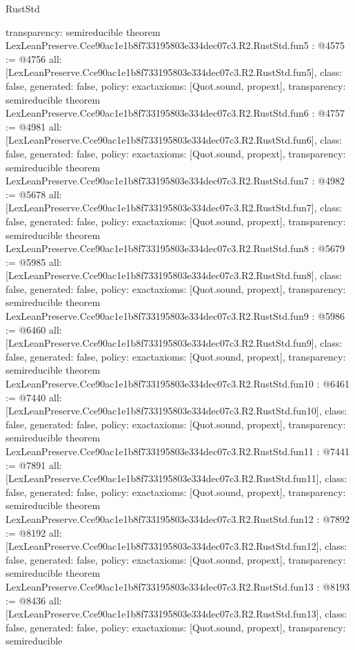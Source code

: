 \begin{lexlean}{RustStd}
\begin{coremodule}
{  transparency: semireducible
}
theorem LexLeanPreserve.Cce90ac1e1b8f733195803e334dec07c3.R2.RustStd.fun5 : @4575 := @4756 {
  all: [LexLeanPreserve.Cce90ac1e1b8f733195803e334dec07c3.R2.RustStd.fun5],
  class: false,
  generated: false,
  policy: exact{axioms: [Quot.sound, propext]},
  transparency: semireducible
}
theorem LexLeanPreserve.Cce90ac1e1b8f733195803e334dec07c3.R2.RustStd.fun6 : @4757 := @4981 {
  all: [LexLeanPreserve.Cce90ac1e1b8f733195803e334dec07c3.R2.RustStd.fun6],
  class: false,
  generated: false,
  policy: exact{axioms: [Quot.sound, propext]},
  transparency: semireducible
}
theorem LexLeanPreserve.Cce90ac1e1b8f733195803e334dec07c3.R2.RustStd.fun7 : @4982 := @5678 {
  all: [LexLeanPreserve.Cce90ac1e1b8f733195803e334dec07c3.R2.RustStd.fun7],
  class: false,
  generated: false,
  policy: exact{axioms: [Quot.sound, propext]},
  transparency: semireducible
}
theorem LexLeanPreserve.Cce90ac1e1b8f733195803e334dec07c3.R2.RustStd.fun8 : @5679 := @5985 {
  all: [LexLeanPreserve.Cce90ac1e1b8f733195803e334dec07c3.R2.RustStd.fun8],
  class: false,
  generated: false,
  policy: exact{axioms: [Quot.sound, propext]},
  transparency: semireducible
}
theorem LexLeanPreserve.Cce90ac1e1b8f733195803e334dec07c3.R2.RustStd.fun9 : @5986 := @6460 {
  all: [LexLeanPreserve.Cce90ac1e1b8f733195803e334dec07c3.R2.RustStd.fun9],
  class: false,
  generated: false,
  policy: exact{axioms: [Quot.sound, propext]},
  transparency: semireducible
}
theorem LexLeanPreserve.Cce90ac1e1b8f733195803e334dec07c3.R2.RustStd.fun10 : @6461 := @7440 {
  all: [LexLeanPreserve.Cce90ac1e1b8f733195803e334dec07c3.R2.RustStd.fun10],
  class: false,
  generated: false,
  policy: exact{axioms: [Quot.sound, propext]},
  transparency: semireducible
}
theorem LexLeanPreserve.Cce90ac1e1b8f733195803e334dec07c3.R2.RustStd.fun11 : @7441 := @7891 {
  all: [LexLeanPreserve.Cce90ac1e1b8f733195803e334dec07c3.R2.RustStd.fun11],
  class: false,
  generated: false,
  policy: exact{axioms: [Quot.sound, propext]},
  transparency: semireducible
}
theorem LexLeanPreserve.Cce90ac1e1b8f733195803e334dec07c3.R2.RustStd.fun12 : @7892 := @8192 {
  all: [LexLeanPreserve.Cce90ac1e1b8f733195803e334dec07c3.R2.RustStd.fun12],
  class: false,
  generated: false,
  policy: exact{axioms: [Quot.sound, propext]},
  transparency: semireducible
}
theorem LexLeanPreserve.Cce90ac1e1b8f733195803e334dec07c3.R2.RustStd.fun13 : @8193 := @8436 {
  all: [LexLeanPreserve.Cce90ac1e1b8f733195803e334dec07c3.R2.RustStd.fun13],
  class: false,
  generated: false,
  policy: exact{axioms: [Quot.sound, propext]},
  transparency: semireducible
}
\end{coremodule}
\end{lexlean}
